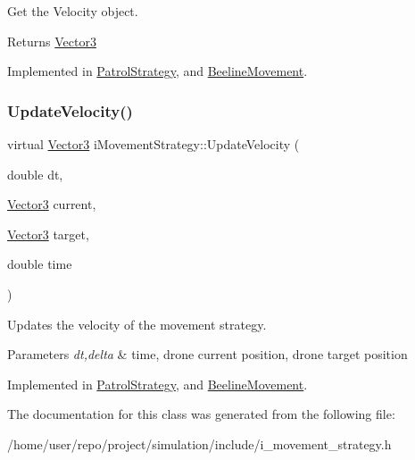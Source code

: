 Get the Velocity object. 

\begin{DoxyReturn}{Returns}
\hyperlink{classVector3}{Vector3} 
\end{DoxyReturn}


Implemented in \hyperlink{classPatrolStrategy_ae5f750fd8d06de17eb1d6b49ee125011}{Patrol\+Strategy}, and \hyperlink{classBeelineMovement_a20adc01dabe57edd17128b81ec49661a}{Beeline\+Movement}.

\mbox{\label{classiMovementStrategy_a40ec6c329ca0842638af80cfd509b372}} 
\subsubsection{\texorpdfstring{Update\+Velocity()}{UpdateVelocity()}}
{\footnotesize\ttfamily virtual \hyperlink{classVector3}{Vector3} i\+Movement\+Strategy\+::\+Update\+Velocity (\begin{DoxyParamCaption}\item[{double}]{dt,  }\item[{\hyperlink{classVector3}{Vector3}}]{current,  }\item[{\hyperlink{classVector3}{Vector3}}]{target,  }\item[{double}]{time }\end{DoxyParamCaption})\hspace{0.3cm}{\ttfamily [pure virtual]}}



Updates the velocity of the movement strategy. 


\begin{DoxyParams}{Parameters}
{\em dt,delta} & time, drone current position, drone target position \\
\hline
\end{DoxyParams}


Implemented in \hyperlink{classPatrolStrategy_ae73db6cc70f328fed21f9df276a64587}{Patrol\+Strategy}, and \hyperlink{classBeelineMovement_a6fd4a3d6f7be2cb6dfe623ce40fc55c4}{Beeline\+Movement}.



The documentation for this class was generated from the following file\+:\begin{DoxyCompactItemize}
\item 
/home/user/repo/project/simulation/include/i\+\_\+movement\+\_\+strategy.\+h\end{DoxyCompactItemize}
